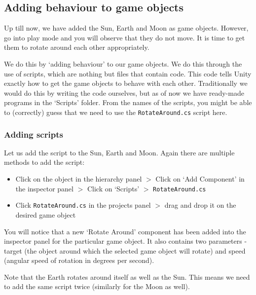 \documentclass{article}[a4paper,12pt]
\theoremstyle{definition}
\begin{document}
\subsection{Adding behaviour to game objects}
Up till now, we have added the Sun, Earth and Moon as game objects. However, go into play mode and you will observe that they do not move. It is time to get them to rotate around each other appropriately. 
\vspace{6pt}

We do this by `adding behaviour' to our game objects. We do this through the use of scripts, which are nothing but files that contain code. This code tells Unity exactly how to get the game objects to behave with each other. Traditionally we would do this by writing the code ourselves, but as of now we have ready-made programs in the `Scripts' folder. From the names of the scripts, you might be able to (correctly) guess that we need to use the \texttt{RotateAround.cs} script here.
\subsubsection{Adding scripts}
Let us add the script to the Sun, Earth and Moon. Again there are multiple methods to add the script:
\begin{itemize}
	\item Click on the object in the hierarchy panel $>$ Click on `Add Component' in the inspector panel $>$ Click on `Scripts' $>$ \texttt{RotateAround.cs}
	\item Click \texttt{RotateAround.cs} in the projects panel $>$ drag and drop it on the desired game object
\end{itemize}
You will notice that a new `Rotate Around' component has been added into the inspector panel for the particular game object. It also contains two parameters - target (the object around which the selected game object will rotate) and speed (angular speed of rotation in degrees per second).
\vspace{6pt}

Note that the Earth rotates around itself as well as the Sun. This means we need to add the same script twice (similarly for the Moon as well).
\end{document}
